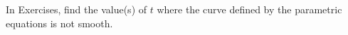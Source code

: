 \begin{exerciseset}{In Exercises}{, find the value(s) of $t$ where the curve defined by the parametric equations is not smooth.}





\end{exerciseset}
